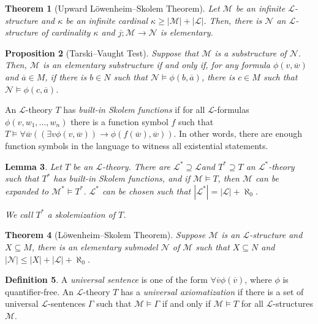 \documentclass{amsart}
\newtheorem{theorem}{Theorem}[subsection]
\newtheorem{lemma}[theorem]{Lemma}
\newtheorem{proposition}[theorem]{Proposition}
\theoremstyle{definition}
\newtheorem{definition}[theorem]{Definition}
\numberwithin{equation}{section}
\begin{document}
\begin{theorem}[Upward L\"owenheim--Skolem Theorem]
    Let $\mathcal{M}$ be an infinite $\mathcal{L}$-structure and 
    $\kappa$ be an infinite cardinal $\kappa \ge |\mathcal{M}| + |\mathcal{L}|$.
    Then, there is $\mathcal{N}$ an $\mathcal{L}$-structure of cardinality $\kappa$ and $j; \mathcal{M} \to \mathcal{N}$ is elementary.
\end{theorem}

\begin{proposition}[Tarski--Vaught Test]
    Suppose that $\mathcal{M}$ is a substructure of $\mathcal{N}$.
    Then, $\mathcal{M}$ is an elementary substructure if and only if,
    for any formula $\phi(v,\overline{w})$ and $\overline{a} \in M$,
    if there is $b \in N$ such that $\mathcal{N} \models \phi(b,\overline{a})$,
    there is $c \in M$ such that $\mathcal{N} \models \phi(c,\overline{a})$.
\end{proposition}

An $\mathcal{L}$-theory $T$ has \emph{built-in Skolem functions}
if for all $\mathcal{L}$-formulas $\phi(v,w_1,\dots,w_n)$ there is a function symbol $f$
such that $T \models \forall \overline{w} ((\exists v \phi(v,\overline{w})) \to \phi(f(\overline{w}),\overline{w}))$.
In other words, there are enough function symbols in the language to witness all existential statements.

\begin{lemma}
    Let $T$ be an $\mathcal{L}$-theory.
    There are $\mathcal{L}^* \supseteq \mathcal{L}$and $T^* \supseteq T$ an $\mathcal{L}^*$-theory
    such that $T^*$ has built-in Skolem functions,
    and if $\mathcal{M} \models T$,
    then $\mathcal{M}$ can be expanded to $\mathcal{M}^* \models T^*$.
    $\mathcal{L}^*$ can be chosen such that $|\mathcal{L}^*|= |\mathcal{L}|+\aleph_0$.

    We call $T^*$ a skolemization of $T$.
\end{lemma}

\begin{theorem}[L\"owenheim--Skolem Theorem]
    Suppose $\mathcal{M}$ is an $\mathcal{L}$-structure and
    $X \subseteq M$, there is an elementary submodel $\mathcal{N}$ of $\mathcal{M}$
    such that $X \subseteq N$ and $|\mathcal{N}| \le |X| + |\mathcal{L}| + \aleph_0$.
\end{theorem}

\begin{definition}
    A \emph{universal sentence} is one of the form
    $\forall \overline{v} \phi(\overline{v})$,
    where $\phi$ is quantifier-free.
    An $\mathcal{L}$-theory $T$ has a \emph{universal axiomatization} if there is a set of universal $\mathcal{L}$-sentences $\Gamma$
    such that $\mathcal{M} \models \Gamma$ if and only if $\mathcal{M} \models T$ for all $\mathcal{L}$-structures $\mathcal{M}$.
\end{definition}
\end{document}
